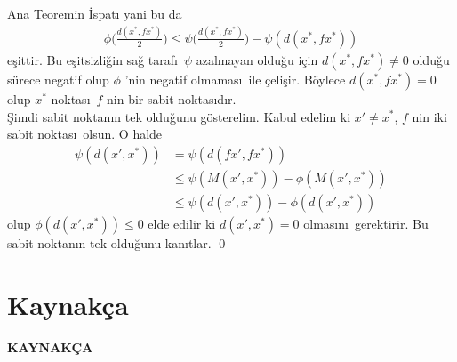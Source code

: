 \documentclass[8pt]{beamer}
\begin{document}
\begin{frame}
  \begin{block}{Ana Teoremin \.{I}spat\i }
    yani bu da
    \begin{align}
      \phi\bigg(\frac{d(x^*,fx^*)}{2}\bigg)  \leq \psi\bigg(\frac{d(x^*,fx^*)}{2}\bigg)-\psi(d(x^*,fx^*))
    \end{align}
e\c{s}ittir. Bu e\c{s}itsizli\u{g}in sa\u{g} taraf\i\ $\psi$ azalmayan oldu\u{g}u i\c{c}in $d(x^*,fx^*)\neq 0$ oldu\u{g}u s\"urece  negatif  olup $\phi$ 'nin negatif olmamas\i\ ile \c{c}eli\c{s}ir. B\"oylece $d(x^*,fx^*)=0$ olup $x^*$ noktas\i\ $f$ nin bir sabit noktas\i d\i r.\\
\vspace{10pt}
\hspace{5pt} \c{S}imdi sabit noktan\i n tek oldu\u{g}unu g\"osterelim. Kabul edelim ki $x'\neq x^*$, $f$ nin iki sabit noktas\i\ olsun. O halde 
   \begin{align}
     \psi(d(x',x^*))&=\psi(d(fx',fx^*))\\
      &\leq \psi(M(x',x^*))-\phi(M(x',x^*))\\
      & \leq \psi(d(x',x^*))-\phi(d(x',x^*))
   \end{align}
olup $\phi(d(x',x^*))\leq 0$ elde edilir ki $d(x',x^*)=0$ olmas\i n\i\ gerektirir. Bu sabit noktan\i n tek oldu\u{g}unu kan\i tlar. \qed
  \end{block}
\end{frame} %

\section{Kaynak\c{c}a}
\textbf{KAYNAK\c{C}A}


\nocite{*}
\end{document}
